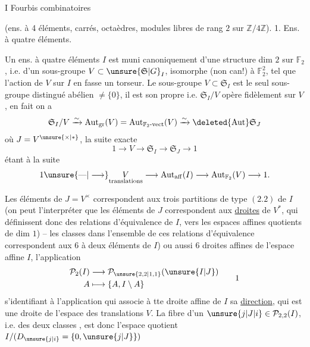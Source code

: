 I \hfill Fourbis combinatoires

(ens. à 4 éléments, carrés, octaèdres, modules libres de rang $2$ sur $\mathbb{Z}/4\mathbb{Z}$).
1. Ens. à quatre éléments.

Un ens. à quatre éléments $I$ est muni canoniquement d'une structure   dim $2$ sur $\mathbb{F}_2$, i.e. d'un sous-groupe $V\subset\unsure{\mathfrak{S}|G}_I$, isomorphe (non can!) à $\mathbb{F}_2^2$, tel que l'action de $V$ sur  $I$ en fasse un torseur. Le sous-groupe $V\subset\mathfrak{S}_I$ est le seul sous-groupe distingué abélien $\ne\{0\}$,  il est son propre   i.e. $\mathfrak{S}_I/V$ opère fidèlement sur $V$, en fait on a
\[
\mathfrak{S}_I/V\xrightarrow{\sim}\mathrm{Aut}_{\mathrm{gr}}(V)=\mathrm{Aut}_{\mathbb{F}_2\text{-vect}}(V)\xrightarrow{\sim}\deleted{\mathrm{Aut}}\mathfrak{S}_J
\]
où $J=V^{\unsure{\times|*}}$, la suite exacte
\[
1\longrightarrow V\longrightarrow\mathfrak{S}_I\longrightarrow\mathfrak{S}_J\longrightarrow1
\]
étant   à la suite
\[
1\unsure{\text{---}|\longrightarrow}\underset{\text{translations}}{V}\longrightarrow\mathrm{Aut}_{\mathrm{aff}}(I)\longrightarrow\mathrm{Aut}_{\mathbb{F}_2}(V)\longrightarrow1.
\]

Les  éléments de $J=V^{\times}$ correspondent aux trois partitions de type $(2.2)$ de $I$
(on peut l'interpréter  que les éléments de $J$ correspondent aux \uline{droites}  de $V^{*}$, qui définissent  donc des  relations d'équivalence de $I$, vers les espaces affines quotients de dim $1$) -- les classes  dans l'ensemble de ces  relations d'équivalence correspondent aux $6$   à deux éléments de $I$) ou aussi  $6$ droites affines de l'espace affine $I$, l'application
\[
\begin{aligned}
\mathcal{P}_2(I)&\longrightarrow\mathcal{P}_{\unsure{2,2|1,1}}(\unsure{I|J})\\
A&\longmapsto\{A,I\setminus A\}
\end{aligned}\tag*{1}
\]
s'identifiant à l'application qui associe à tte droite affine de $I$ sa \uline{direction}, qui est une droite de l'espace des translations $V$. La fibre d'un $\unsure{j|J|i}\in\mathcal{P}_{2,2}(I)$, i.e.  des  deux classes , est donc l'espace quotient $I/(D_{\unsure{j|i}}=\{0,\unsure{j|J}\})$

